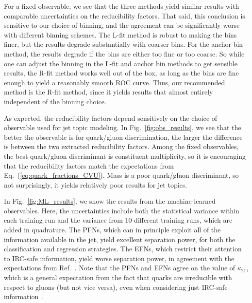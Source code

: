 \documentclass[aps,prd,twocolumn,preprintnumbers,nofootinbib,longbibliography,floatfix]{revtex4-1}
\DeclareRobustCommand{\Fig}[1]{Fig.~\ref{#1}}
\DeclareRobustCommand{\Eq}[1]{Eq.~(\ref{#1})}
\DeclareRobustCommand{\Ref}[1]{Ref.~\cite{#1}}
\newcommand{\cor}[1]{#1}
\begin{document}
For a fixed observable, we see that the three methods yield similar results with comparable uncertainties on the reducibility factors.
%
That said, this conclusion is sensitive to our choice of binning, and the agreement can be significantly worse with different binning schemes.
%
The L-fit method is robust to making the bins finer, but the results degrade substantially with coarser bins.
%
For the anchor bin method, the results degrade if the bins are either too fine or too coarse.
%
So while one can adjust the binning in the L-fit and anchor bin methods to get sensible results, the R-fit method works well out of the box, as long as the bins are fine enough to yield a reasonably smooth ROC curve.
%
Thus, our recommended method is the R-fit method, since it yields results that almost entirely independent of the binning choice.





As expected, the reducibility factors depend sensitively on the choice of observable used for jet topic modeling.
%
\cor{In \Fig{fig:obs_results}, we see that the better the observable is for quark/gluon discrimination, the larger the difference is between the two extracted reducibility factors.}
%
Among the fixed observables, the best quark/gluon discriminant is constituent multiplicity, so it is encouraging that the reducibility factors match the expectations from \Eq{eq:quark_fractions_CVU}.
%
Mass is a poor quark/gluon discriminant, so not surprisingly, it yields relatively poor results for jet topics.


In \Fig{fig:ML_results}, we show the results from the machine-learned observables.
%
Here, the uncertainties include both the statistical variance within each training run and the variance from 10 different training runs, which are added in quadrature.
%
The PFNs, which can in principle exploit all of the information available in the jet, yield excellent separation power, for both the classification and regression strategies.
%
The EFNs, which restrict their attention to IRC-safe information, yield worse separation power, in agreement with the expectations from \Ref{Komiske:2018vkc}.
%
Note that the PFNs and EFNs agree on the value of $\kappa_{21}$, which is a general expectation from the fact that quarks are irreducible with respect to gluons (but not vice versa), even when considering just IRC-safe information~\cite{Metodiev:2018ftz,Larkoski:2019nwj}. 
\end{document}
